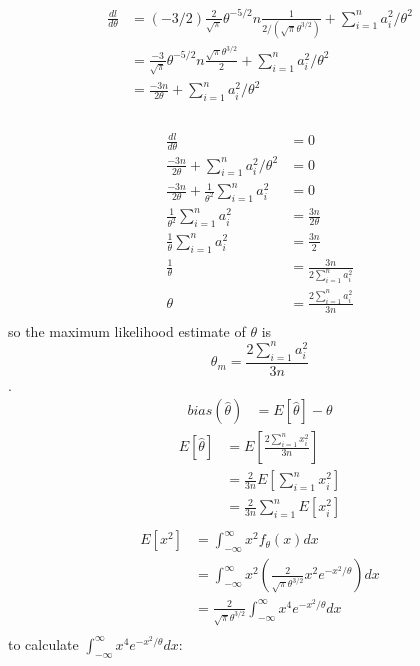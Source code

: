 \documentclass[12pt,border=4pt,multi]{article} %
\begin{document}
\begin{align*}
\frac{dl}{d\theta} &= (-3 / 2)\frac{2}{\sqrt{\pi}}\theta^{-5 / 2} n \frac{1}{2 / (\sqrt{\pi}\theta^{3 / 2})} +　\sum_{i = 1}^n a_i^2 / \theta^2\\
&= \frac{-3}{\sqrt{\pi}}\theta^{-5 / 2} n \frac{\sqrt{\pi}\theta^{3 / 2}}{2} + \sum_{i = 1}^n a_i^2 / \theta^2\\
&= \frac{-3n}{2\theta} + \sum_{i = 1}^n a_i^2 / \theta^2\\
\end{align*}\\
\begin{align*}
\frac{dl}{d\theta} &= 0\\
\frac{-3n}{2\theta} + \sum_{i = 1}^n a_i^2 / \theta^2 &= 0\\
\frac{-3n}{2\theta} + \frac{1}{\theta^2}\sum_{i = 1}^n a_i^2 &= 0\\
\frac{1}{\theta^2}\sum_{i = 1}^n a_i^2 &= \frac{3n}{2\theta}\\
\frac{1}{\theta}\sum_{i = 1}^n a_i^2 &= \frac{3n}{2}\\
\frac{1}{\theta} &= \frac{3n}{2\sum_{i = 1}^n a_i^2}\\
\theta &= \frac{2\sum_{i = 1}^n a_i^2}{3n}\\
\end{align*}
so the maximum likelihood estimate of $\theta$ is
\[\theta_m = \frac{2\sum_{i = 1}^n a_i^2}{3n}\]
\newpage
{}.\\
\begin{align*}
bias(\hat{\theta}) &= E[\hat{\theta}] - \theta
\end{align*}
\begin{align*}
E[\hat{\theta}] &= E\left[\frac{2\sum_{i = 1}^n x_i^2}{3n}\right]\\
&= \frac{2}{3n}E[\sum_{i = 1}^n x_i^2]\\
&= \frac{2}{3n}\sum_{i = 1}^n E[x_i^2]\\
\end{align*}
\begin{align*}
E[x^2] &= \int_{-\infty}^{\infty} x^2 f_\theta(x) dx\\
&= \int_{-\infty}^{\infty} x^2 \left(\frac{2}{\sqrt{\pi}\theta^{3 / 2}} x^2 e^{-x^2 / \theta}\right) dx\\
&= \frac{2}{\sqrt{\pi}\theta^{3 / 2}} \int_{-\infty}^{\infty} x^4 e^{-x^2 / \theta} dx\\
\end{align*}
to calculate $\int_{-\infty}^{\infty} x^4 e^{-x^2 / \theta} dx$:\\ 
\end{document}
